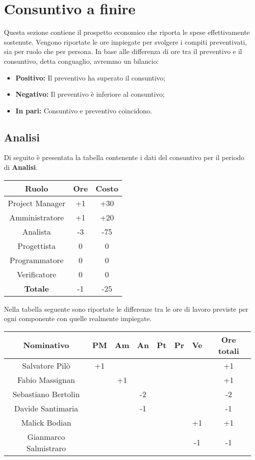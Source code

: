 \section{Consuntivo a finire}
Questa sezione contiene il prospetto economico che riporta le spese effettivamente sostenute. Vengono riportate le ore impiegate per svolgere i compiti preventivati, sia per ruolo che per persona. In base alle differenza di ore tra il preventivo e il consuntivo, detta conguaglio, avremmo un bilancio: \\
\begin{itemize}
	\item \textbf{Positivo:} Il preventivo ha superato il consuntivo;
	\item \textbf{Negativo:} Il preventivo è inferiore al consuntivo;
	\item \textbf{In pari:} Consuntivo e preventivo coincidono. \\
\end{itemize}
	\subsection{Analisi}
	Di seguito è presentata la tabella contenente i dati del consuntivo per il periodo di \textbf{Analisi}.
	\begin{table}[H]
		\centering
		\begin{tabular}{|c|c|c|}
			\hline
			\textbf{Ruolo}		& \textbf{Ore}	& \textbf{Costo} \\
			\hline
			Project Manager		& +1		& +30	\\
			Amministratore		& +1		& +20	\\
			Analista			& -3		& -75	\\
			Progettista			& 0			& 0	\\
			Programmatore		& 0			& 0	\\
			Verificatore		& 0			& 0	\\
			\hline
			\textbf{Totale}		& -1		& -25	\\
			\hline
		\end{tabular}
	\end{table}
	Nella tabella seguente sono riportate le differenze tra le ore di lavoro previste per ogni componente con quelle realmente impiegate.
	\begin{table}[H]
		\centering
		\begin{tabular}{|c|c|c|c|c|c|c|c|}
			\hline
			\textbf{Nominativo}		& \textbf{PM}	& \textbf{Am}	& \textbf{An}	& \textbf{Pt}	& \textbf{Pr}	& \textbf{Ve}	& \textbf{Ore totali}     \\
			\hline
			Salvatore Pilò			& +1	& 		& 		&		&		&		& +1 \\
			Fabio Massignan			&		& +1	&		&		&		& 		& +1 \\
			Sebastiano Bertolin		&		& 	 	& -2	&		&		&		& -2 \\
			Davide Santimaria		&		& 		& -1	&		&		&		& -1 \\
			Malick Bodian			& 		&		&		&		&		& +1	& +1 \\
			Gianmarco Salmistraro	&		&		& 	 	&		&		& -1	& -1 \\
			\hline
		\end{tabular}
	\end{table}
